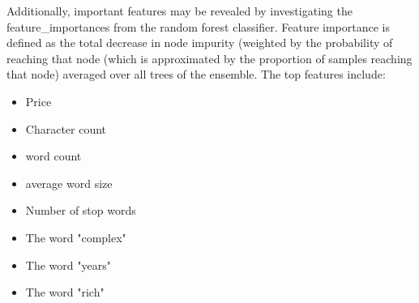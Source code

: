 \documentclass[11pt]{article}
\providecommand{\tightlist}{%
      \setlength{\itemsep}{0pt}\setlength{\parskip}{0pt}}
\begin{document}
    Additionally, important features may be revealed by investigating the
feature\_importances from the random forest classifier. Feature
importance is defined as the total decrease in node impurity (weighted
by the probability of reaching that node (which is approximated by the
proportion of samples reaching that node) averaged over all trees of the
ensemble. The top features include:

\begin{itemize}
\tightlist
\item
  Price
\item
  Character count
\item
  word count
\item
  average word size
\item
  Number of stop words
\item
  The word "complex"
\item
  The word "years"
\item
  The word "rich"
\end{itemize}
\end{document}
